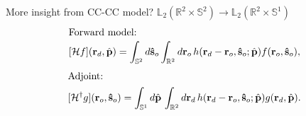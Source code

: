 \documentclass[presentation]{beamer}
\providecommand{\mb}[1]{\mathbf{#1}}
\providecommand{\ro}[1]{\mathbf{\mathbf{r}}_o}
\providecommand{\so}[1]{\mathbf{\hat{s}}_o}
\providecommand{\rd}[1]{\mathbf{r}_d}
\providecommand{\mbb}[1]{\mathbb{#1}}
\providecommand{\bs}[1]{\boldsymbol{#1}}
\begin{document}
\begin{frame}{More insight from CC-CC model? $\mbb{L}_2(\mbb{R}^2 \times \mbb{S}^2) \rightarrow \mbb{L}_2(\mbb{R}^{2}\times \mbb{S}^1)$}
  \vspace{-2em}
  \begin{align*}
    \intertext{Forward model:}
    [\mathcal{H}f](\rd{}, \hat{\mb{p}}) = \int_{\mbb{S}^2}d\so{}\int_{\mbb{R}^2}d\ro{}\, h(\rd{} -\ro{}, \so{}; \hat{\mb{p}})f(\ro{}, \so{}),
  \end{align*}
    \begin{align*}    
    \intertext{Adjoint:}
    [\mathcal{H}^{\dagger}g](\ro{}, \so{}) = \int_{\mbb{S}^1}d\hat{\mb{p}}\, \int_{\mbb{R}^2}d\mb{r}_{d}\, h(\rd{} - \ro{}, \so{}; \hat{\mb{p}})g(\rd{}, \hat{\mb{p}}).
    \end{align*}
\end{frame}

  
\end{document}
